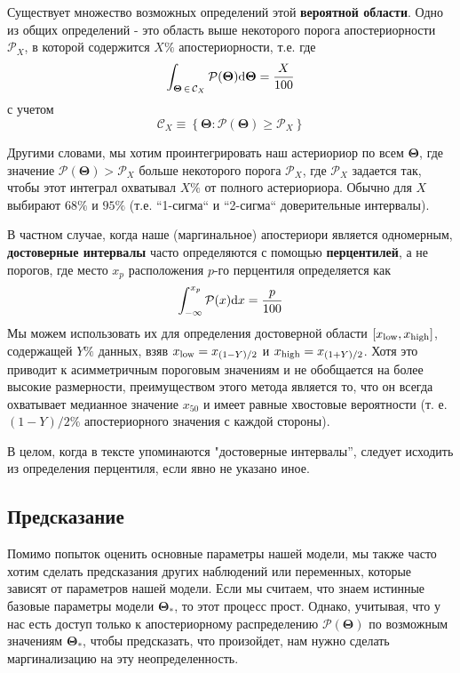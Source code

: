 \documentclass[12pt, titlepage]{article}
\newcommand{\deriv}{\ensuremath{{\rm d}}}  %
\newcommand{\params}{\ensuremath{\boldsymbol\Theta}}
\newcommand{\posterior}{\ensuremath{\mathcal{P}}}
\newcommand{\credible}{\ensuremath{\mathcal{C}}}
\begin{document}
Существует множество возможных определений этой \textbf{вероятной области}. Одно из общих определений - это область выше некоторого порога апостериорности $\posterior_X$, в которой содержится $X\%$ апостериорности, т.е. где
\begin{equation}
    \int_{\params \,\in\, \credible_X} \posterior(\params) \deriv \params
    = \frac{X}{100}
\end{equation}
с учетом
\begin{equation}
    \credible_X
    \equiv \left\{ \params : \posterior(\params) \geq \posterior_X \right\}
\end{equation}

Другими словами, мы хотим проинтегрировать наш астериориор по всем $\params$, где значение $\posterior(\params) > \posterior_X$ больше некоторого порога $\posterior_X$, где $\posterior_X$ задается так, чтобы этот интеграл охватывал $X\%$ от полного астериориора. Обычно для $X$ выбирают $68\%$ и $95\%$ (т.е. ``1-сигма`` и ``2-сигма`` доверительные интервалы).

В частном случае, когда наше (маргинальное) апостериори является одномерным, \textbf{достоверные интервалы} часто определяются с помощью \textbf{перцентилей}, а не порогов, где место $x_p$ расположения $p$-го перцентиля определяется как
\begin{equation}
    \int_{-\infty}^{x_p} \posterior(x) \deriv x = \frac{p}{100}
\end{equation}
Мы можем использовать их для определения достоверной области $[x_{\rm low}, x_{\rm high}]$, содержащей $Y\%$ данных, взяв $x_{\rm low} = x_{(1-Y)/2}$ и $x_{\rm high} = x_{(1+Y)/2}$. Хотя это приводит к асимметричным пороговым значениям и не обобщается на более высокие размерности, преимуществом этого метода является то, что он всегда охватывает медианное значение $x_{50}$ и имеет равные хвостовые вероятности (т. е. $(1-Y)/2\%$ апостериорного значения с каждой стороны).

В целом, когда в тексте упоминаются "достоверные интервалы'', следует исходить из определения перцентиля, если явно не указано иное.

\subsection{Предсказание} \label{subsec:pred}

Помимо попыток оценить основные параметры нашей модели, мы также часто хотим сделать предсказания других наблюдений или переменных, которые зависят от параметров нашей модели. Если мы считаем, что знаем истинные базовые параметры модели $\params_*$, то этот процесс прост. Однако, учитывая, что у нас есть доступ только к апостериорному распределению $\posterior(\params)$ по возможным значениям $\params_*$, чтобы предсказать, что произойдет, нам нужно сделать маргинализацию на эту неопределенность.
\end{document}
